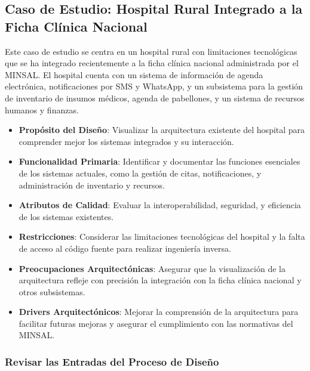 \color{blue}
\subsection{Caso de Estudio: Hospital Rural Integrado a la Ficha Clínica Nacional}

Este caso de estudio se centra en un hospital rural con limitaciones tecnológicas que se ha integrado recientemente a la ficha clínica nacional administrada por el MINSAL. El hospital cuenta con un sistema de información de agenda electrónica, notificaciones por SMS y WhatsApp, y un subsistema para la gestión de inventario de insumos médicos, agenda de pabellones, y un sistema de recursos humanos y finanzas.

\begin{itemize}
    \item \textbf{Propósito del Diseño}: Visualizar la arquitectura existente del hospital para comprender mejor los sistemas integrados y su interacción.
    \item \textbf{Funcionalidad Primaria}: Identificar y documentar las funciones esenciales de los sistemas actuales, como la gestión de citas, notificaciones, y administración de inventario y recursos.
    \item \textbf{Atributos de Calidad}: Evaluar la interoperabilidad, seguridad, y eficiencia de los sistemas existentes.
    \item \textbf{Restricciones}: Considerar las limitaciones tecnológicas del hospital y la falta de acceso al código fuente para realizar ingeniería inversa.
    \item \textbf{Preocupaciones Arquitectónicas}: Asegurar que la visualización de la arquitectura refleje con precisión la integración con la ficha clínica nacional y otros subsistemas.
    \item \textbf{Drivers Arquitectónicos}: Mejorar la comprensión de la arquitectura para facilitar futuras mejoras y asegurar el cumplimiento con las normativas del MINSAL.
\end{itemize}

\subsubsection{Revisar las Entradas del Proceso de Diseño}

